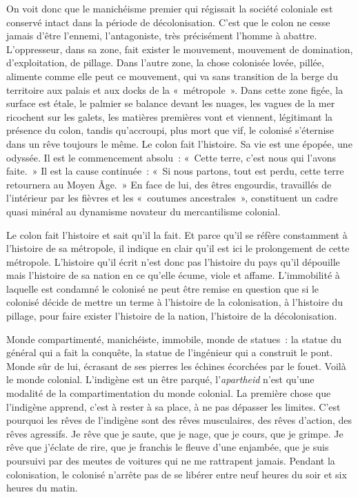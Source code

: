 \documentclass[french,twoside]{book} %
\begin{document}
\noindent On voit donc que le manichéisme premier qui régissait la société coloniale est conservé intact dans la période de décolonisation. C’est que le colon ne cesse jamais d’être l’ennemi, l’antagoniste, très précisément l’homme à abattre. L’oppresseur, dans sa zone, fait exister le mouvement, mouvement de domination, d’exploitation, de pillage. Dans l’autre zone, la chose colonisée lovée, pillée, alimente comme elle peut ce mouvement, qui va sans transition de la berge du territoire aux palais et aux docks de la « métropole ». Dans cette zone figée, la surface est étale, le palmier se balance devant les nuages, les vagues de la mer ricochent sur les galets, les matières premières vont et viennent, légitimant la présence du colon, tandis qu’accroupi, plus mort que vif, le colonisé s’éternise dans un rêve toujours le même. Le colon fait l’histoire. Sa vie est une épopée, une odyssée. Il est le   commencement absolu : « Cette terre, c’est nous qui l’avons faite. » Il est la cause continuée : « Si nous partons, tout est perdu, cette terre retournera au Moyen Âge. » En face de lui, des êtres engourdis, travaillés de l’intérieur par les fièvres et les « coutumes ancestrales », constituent un cadre quasi minéral au dynamisme novateur du mercantilisme colonial.\par
\bigbreak
\noindent Le colon fait l’histoire et sait qu’il la fait. Et parce qu’il se réfère constamment à l’histoire de sa métropole, il indique en clair qu’il est ici le prolongement de cette métropole. L’histoire qu’il écrit n’est donc pas l’histoire du pays qu’il dépouille mais l’histoire de sa nation en ce qu’elle écume, viole et affame. L’immobilité à laquelle est condamné le colonisé ne peut être remise en question que si le colonisé décide de mettre un terme à l’histoire de la colonisation, à l’histoire du pillage, pour faire exister l’histoire de la nation, l’histoire de la décolonisation.\par
\bigbreak
\noindent Monde compartimenté, manichéiste, immobile, monde de statues : la statue du général qui a fait la conquête, la statue de l’ingénieur qui a construit le pont. Monde sûr de lui, écrasant de ses pierres les échines écorchées par le fouet. Voilà le monde colonial. L’indigène est un être parqué, l’\emph{apartheid} n’est qu’une modalité de la compartimentation du monde colonial. La première chose que l’indigène apprend, c’est à rester à sa place, à ne pas dépasser les limites. C’est pourquoi les rêves de l’indigène sont des rêves musculaires, des rêves d’action, des rêves agressifs. Je rêve que je saute, que je nage, que je cours, que je grimpe. Je rêve que j’éclate de rire, que je franchis le fleuve d’une enjambée, que je suis poursuivi par des meutes de voitures qui ne me rattrapent jamais. Pendant la colonisation, le colonisé n’arrête pas de se libérer entre neuf heures du soir et six heures du matin.\par
\end{document}
